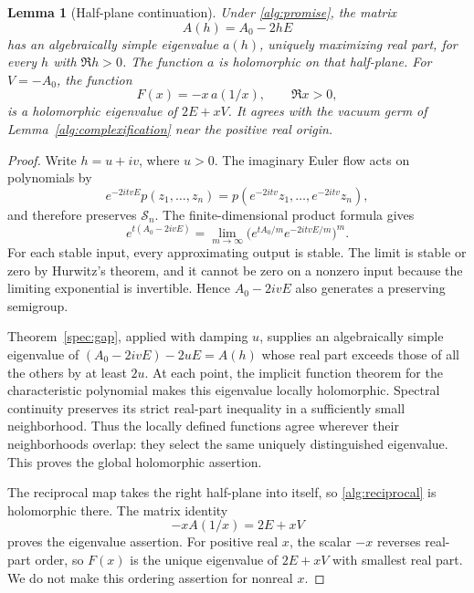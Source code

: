 \documentclass[reqno]{amsart}
\newtheorem{lemma}[theorem]{Lemma}
\theoremstyle{definition}
\theoremstyle{remark}
\begin{document}
\begin{lemma}[Half-plane continuation]
\label{alg:half-plane}
Under \eqref{alg:promise}, the matrix
\[
 A(h)=A_0-2hE
 \]
has an algebraically simple eigenvalue \(a(h)\), uniquely maximizing
real part, for every \(h\) with \(\Re h>0\).
The function \(a\) is holomorphic on that half-plane.
For \(V=-A_0\), the function
\begin{equation}
 F(x)=-x\,a(1/x),\qquad \Re x>0,
 \label{alg:reciprocal}
\end{equation}
is a holomorphic eigenvalue of \(2E+xV\).
It agrees with the vacuum germ of
Lemma~\ref{alg:complexification} near the positive real origin.
\end{lemma}

\begin{proof}
Write \(h=u+iv\), where \(u>0\).
The imaginary Euler flow acts on polynomials by
\[
 e^{-2itvE}p(z_1,\ldots,z_n)
   =p(e^{-2itv}z_1,\ldots,e^{-2itv}z_n),
 \]
and therefore preserves \(\mathcal S_n\).
The finite-dimensional product formula gives
\[
 e^{t(A_0-2ivE)}
   =\lim_{m\to\infty}
       \bigl(e^{tA_0/m}e^{-2itvE/m}\bigr)^m.
 \]
For each stable input, every approximating output is stable.
The limit is stable or zero by Hurwitz's theorem, and it cannot
be zero on a nonzero input because the limiting exponential is
invertible.  Hence \(A_0-2ivE\) also generates a preserving
semigroup.

Theorem~\ref{spec:gap}, applied with damping \(u\), supplies an
algebraically simple eigenvalue of
\((A_0-2ivE)-2uE=A(h)\) whose real part exceeds those of all the
others by at least \(2u\).  At each point, the implicit function
theorem for the characteristic polynomial makes this eigenvalue
locally holomorphic.  Spectral continuity preserves its strict
real-part inequality in a sufficiently small neighborhood.
Thus the locally defined functions agree wherever their
neighborhoods overlap: they select the same uniquely distinguished
eigenvalue.  This proves the global holomorphic assertion.

The reciprocal map takes the right half-plane into itself, so
\eqref{alg:reciprocal} is holomorphic there.  The matrix identity
\[
 -x A(1/x)=2E+xV
 \]
proves the eigenvalue assertion.  For positive real \(x\), the
scalar \(-x\) reverses real-part order, so \(F(x)\) is the unique
eigenvalue of \(2E+xV\) with smallest real part.  We do not make
this ordering assertion for nonreal \(x\).


\end{proof}
\end{document}
